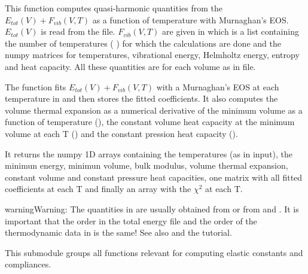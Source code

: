 \documentclass[letterpaper,10pt,english]{sphinxmanual}
\begin{document}
\begin{fulllineitems}
\label{pyqha:pyqha.fitFvib.fitFvibV}
This function computes quasi-harmonic quantities from the 
\(E_{tot}(V)+F_{vib}(V,T)\) as a function of temperature with Murnaghan's
EOS. \(E_{tot}(V)\) is read from the  file. \(F_{vib}(V,T)\)
are given in  which is a list containing the number of temperatures
(  ) for which the calculations are done and the numpy matrices for 
temperatures, vibrational energy, Helmholtz energy, entropy and
heat capacity. All these quantities are for each volume as in  file.

The function fits \(E_{tot}(V)+F_{vib}(V,T)\) with a Murnaghan's EOS
at each temperature in  and then stores the fitted coefficients.
It also computes the volume thermal expansion as a numerical derivative of
the minimum volume as a function of temperature (), the
constant volume heat capacity at the minimum volume at each T
() and the constant pression heat capacity ().

It returns the numpy 1D arrays containing the temperatures (as in input), the
minimun energy, minimun volume, bulk modulus, volume thermal expansion, constant
volume and constant pressure heat capacities, one matrix with all fitted 
coefficients at each T and finally an array with the \(\chi^2\) at each T.

\begin{sphinxadmonition}{warning}{Warning:}
The quantities in  are usually obtained from 
or from  and . It is
important that the order in the total energy file  and the order of
the thermodynamic data in  is the same!  See also  and 
the tutorial.
\end{sphinxadmonition}

\end{fulllineitems}

\label{pyqha:module-pyqha.fitC}
This submodule groups all functions relevant for computing elastic constants and
compliances.
\end{document}
